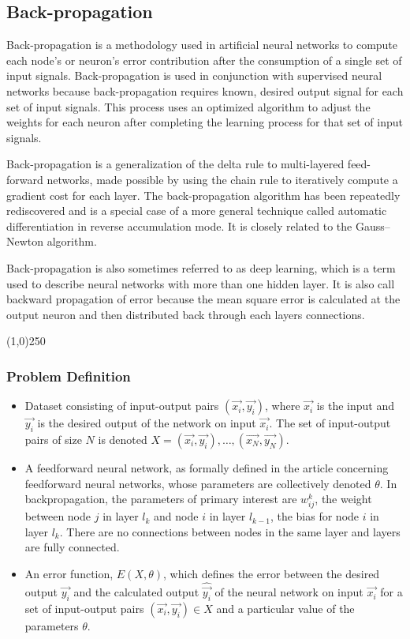 \documentclass[journal]{IEEEtran}
\begin{document}
\subsection{Back-propagation}
Back-propagation is a methodology used in artificial neural networks to compute each node's or neuron's error contribution after the consumption of a single set of input signals.  Back-propagation is used in conjunction with supervised neural networks because back-propagation requires known, desired output signal for each set of input signals. This process uses an optimized algorithm to adjust the weights for each neuron after completing the learning process for that set of input signals.

Back-propagation is a generalization of the delta rule to multi-layered feed-forward networks, made possible by using the chain rule to iteratively compute a gradient cost for each layer. The back-propagation algorithm has been repeatedly rediscovered and is a special case of a more general technique called automatic differentiation in reverse accumulation mode. It is closely related to the Gauss–Newton algorithm.

Back-propagation is also sometimes referred to as deep learning, which is a term used to describe neural networks with more than one hidden layer.  It is also call backward propagation of error because the mean square error is calculated at the output neuron and then distributed back through each layers connections.

\begin{center}
\line(1,0){250}
\end{center}
\subsubsection{Problem Definition}
\begin{itemize}
    \item Dataset consisting of input-output pairs $(\vec{x_i},\vec{y_i})$, where $\vec{x_i}$ is the input and $\vec{y_i}$ is the desired output of the network on input $\vec{x_i}$.  The set of input-output pairs of size $N$ is denoted $X = {(\vec{x_i},\vec{y_i}), \dots,(\vec{x_N},\vec{y_N})}$.
    \item A feedforward neural network, as formally defined in the article concerning feedforward neural networks, whose parameters are collectively denoted $\theta$.  In backpropagation, the parameters of primary interest are $w_{ij}^k$, the weight between node $j$ in layer $l_k$ and node $i$ in layer $l_{k-1}$, the bias for node $i$ in layer $l_k$.  There are no connections between nodes in the same layer and layers are fully connected.
    \item An error function, $E(X, \theta)$, which defines the error between the desired output $\vec{y_i}$ and the calculated output $\hat{\vec{y_i}}$ of the neural network on input $\vec{x_i}$ for a set of input-output pairs $(\vec{x_i}, \vec{y_i}) \in X$ and a particular value of the parameters $\theta$.
\end{itemize}
\end{document}
